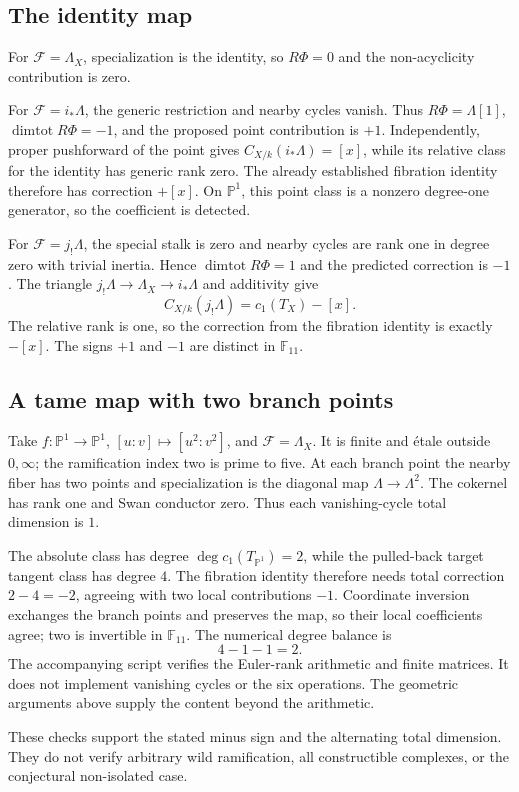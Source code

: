 \documentclass[10pt]{article}
\begin{document}
\subsection*{The identity map}
For \(\mathcal F=\Lambda_X\), specialization is the identity, so \(R\Phi=0\) and the non-acyclicity contribution is zero.\par
For \(\mathcal F=i_*\Lambda\), the generic restriction and nearby cycles vanish. Thus \(R\Phi=\Lambda[1]\), \(\operatorname{dimtot}R\Phi=-1\), and the proposed point contribution is \(+1\). Independently, proper pushforward of the point gives \(C_{X/k}(i_*\Lambda)=[x]\), while its relative class for the identity has generic rank zero. The already established fibration identity therefore has correction \(+[x]\). On \(\mathbb P^1\), this point class is a nonzero degree-one generator, so the coefficient is detected.\par
For \(\mathcal F=j_!\Lambda\), the special stalk is zero and nearby cycles are rank one in degree zero with trivial inertia. Hence \(\operatorname{dimtot}R\Phi=1\) and the predicted correction is \(-1\). The triangle \(j_!\Lambda\to\Lambda_X\to i_*\Lambda\) and additivity give \[C_{X/k}(j_!\Lambda)=c_1(T_X)-[x].\] The relative rank is one, so the correction from the fibration identity is exactly \(-[x]\). The signs \(+1\) and \(-1\) are distinct in \(\mathbb F_{11}\).\par
\subsection*{A tame map with two branch points}
Take \(f:\mathbb P^1\to\mathbb P^1\), \([u:v]\mapsto[u^2:v^2]\), and \(\mathcal F=\Lambda_X\). It is finite and étale outside \(0,\infty\); the ramification index two is prime to five. At each branch point the nearby fiber has two points and specialization is the diagonal map \(\Lambda\to\Lambda^2\). The cokernel has rank one and Swan conductor zero. Thus each vanishing-cycle total dimension is \(1\).\par
The absolute class has degree \(\deg c_1(T_{\mathbb P^1})=2\), while the pulled-back target tangent class has degree \(4\). The fibration identity therefore needs total correction \(2-4=-2\), agreeing with two local contributions \(-1\). Coordinate inversion exchanges the branch points and preserves the map, so their local coefficients agree; two is invertible in \(\mathbb F_{11}\). The numerical degree balance is \[4-1-1=2.\] The accompanying script verifies the Euler-rank arithmetic and finite matrices. It does not implement vanishing cycles or the six operations. The geometric arguments above supply the content beyond the arithmetic.\par
These checks support the stated minus sign and the alternating total dimension. They do not verify arbitrary wild ramification, all constructible complexes, or the conjectural non-isolated case.\par
\end{document}
